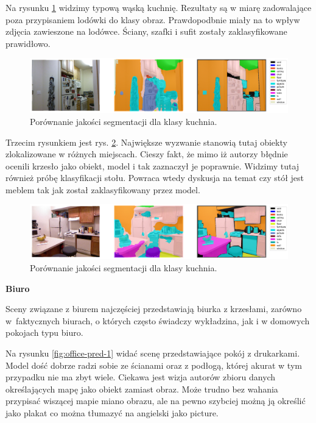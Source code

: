 Na rysunku \ref{fig:kitchen-pred-2} widzimy typową wąską kuchnię. Rezultaty są w miarę zadowalające poza przypisaniem lodówki do klasy obraz. Prawdopodbnie miały na to wpływ zdjęcia zawieszone na lodówce. Ściany, szafki i sufit zostały zaklasyfikowane prawidłowo.

\begin{figure}[ht!]
    \centering
    \includegraphics[width=\textwidth]{img/preds_analysis/gt_vs_pred/kitchen-2.png}
    \caption{Porównanie jakości segmentacji dla klasy kuchnia.}
    \label{fig:kitchen-pred-2}
\end{figure}

Trzecim rysunkiem jest rys. \ref{fig:kitchen-pred-3}. Największe wyzwanie stanowią tutaj obiekty zlokalizowane w różnych miejscach. Cieszy fakt, że mimo iż autorzy błędnie ocenili krzesło jako obiekt, model i tak zaznaczył je poprawnie. Widzimy tutaj również próbę klasyfikacji stołu. Powraca wtedy dyskusja na temat czy stół jest meblem tak jak został zaklasyfikowany przez model.

\begin{figure}[ht!]
    \centering
    \includegraphics[width=\textwidth]{img/preds_analysis/gt_vs_pred/kitchen-3.png}
    \caption{Porównanie jakości segmentacji dla klasy kuchnia.}
    \label{fig:kitchen-pred-3}
\end{figure}

\noindent
\textbf{Biuro}

Sceny związane z biurem najczęściej przedstawiają biurka z krzesłami, zarówno w~faktycznych biurach, o których często świadczy wykładzina, jak i w domowych pokojach typu biuro.

Na rysunku \ref{fig:office-pred-1} widać scenę przedstawiające pokój z drukarkami. Model dość dobrze radzi sobie ze ścianami oraz z podłogą, której akurat w tym przypadku nie ma zbyt wiele. Ciekawa jest wizja autorów zbioru danych określających mapę jako obiekt zamiast obraz. Może trudno bez wahania przypisać wiszącej mapie miano obrazu, ale na pewno szybciej możną ją określić jako plakat co można tłumazyć na angielski jako picture.

